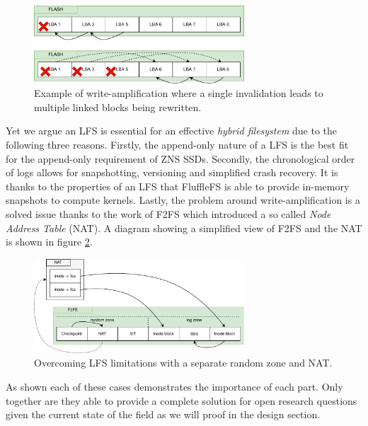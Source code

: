 \begin{figure}
    \centering
	\includegraphics[width=0.7\textwidth]{resources/images/write-amplification.pdf}
	\caption{Example of write-amplification where a single invalidation leads
    to multiple linked blocks being rewritten.}
    \label{figure:writeamplification}
\end{figure}

Yet we argue an LFS is essential for an effective \textit{hybrid filesystem} due
to the following three reasons. Firstly, the append-only nature of a LFS is the
best fit for the append-only requirement of ZNS SSDs. Secondly, the
chronological order of logs allows for snapshotting, versioning and simplified
crash recovery. It is thanks to the properties of an LFS that FluffleFS is able
to provide in-memory snapshots to compute kernels. Lastly, the problem around
write-amplification is a solved issue thanks to the work of F2FS
\cite{Lee2015F2FSAN} which introduced a so called \textit{Node Address Table}
(NAT). A diagram showing a simplified view of F2FS and the NAT is shown in
figure \ref{figure:f2fsnat}.

\begin{figure}
    \centering
	\includegraphics[width=0.7\textwidth]{resources/images/f2fs-nat.pdf}
	\caption{Overcoming LFS limitations with a separate random zone and NAT.}
    \label{figure:f2fsnat}
\end{figure}

As shown each of these cases demonstrates the importance of each part. Only
together are they able to provide a complete solution for open research
questions given the current state of the field as we will proof in the design
section.

